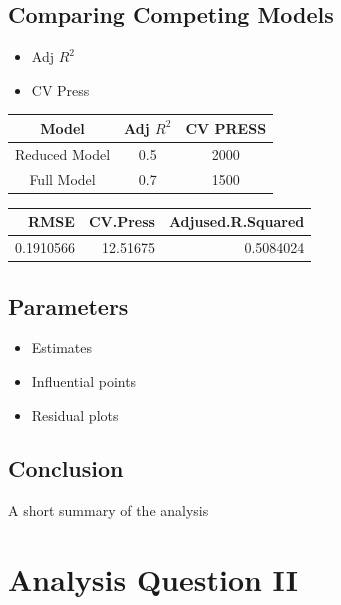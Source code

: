 \documentclass[american,]{article}
\providecommand{\tightlist}{%
  \setlength{\itemsep}{0pt}\setlength{\parskip}{0pt}}
\begin{document}
\hypertarget{comparing-competing-models}{%
\subsection{Comparing Competing
Models}\label{comparing-competing-models}}

\begin{itemize}
\tightlist
\item
  Adj \(R^2\)
\item
  CV Press
\end{itemize}

\begin{table}
\centering
\begin{tabular}{|c|c|c|}
\hline
Model         & Adj $R^2$ & CV PRESS \\ \hline
Reduced Model & 0.5       & 2000     \\ \hline
Full Model    & 0.7       & 1500     \\ \hline
\end{tabular}
\end{table}

\begin{tabular}{r|r|r}
\hline
RMSE & CV.Press & Adjused.R.Squared\\
\hline
0.1910566 & 12.51675 & 0.5084024\\
\hline
\end{tabular}

\hypertarget{parameters}{%
\subsection{Parameters}\label{parameters}}

\begin{itemize}
\tightlist
\item
  Estimates
\item
  Influential points
\item
  Residual plots
\end{itemize}

\hypertarget{conclusion}{%
\subsection{Conclusion}\label{conclusion}}

A short summary of the analysis

\hypertarget{analysis-question-ii}{%
\section{Analysis Question II}\label{analysis-question-ii}}
\end{document}
